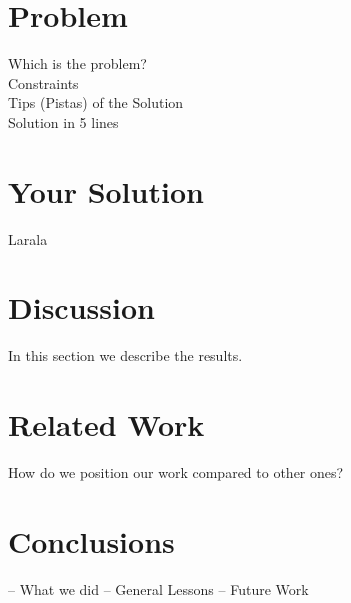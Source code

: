 \documentclass[11pt, twocolumn]{article}
\begin{document}
\section{Problem}\label{problem}
Which is the problem?\\
Constraints\\
Tips (Pistas) of the Solution\\
Solution in 5 lines\\

\section{Your Solution}\label{your solution}
Larala

\section{Discussion}\label{Discussion}
In this section we describe the results.

\section{Related Work}\label{related work}
How do we position our work compared to other ones?

\section{Conclusions}\label{conclusions}
– What we did
– General Lessons
– Future Work



\end{document}
